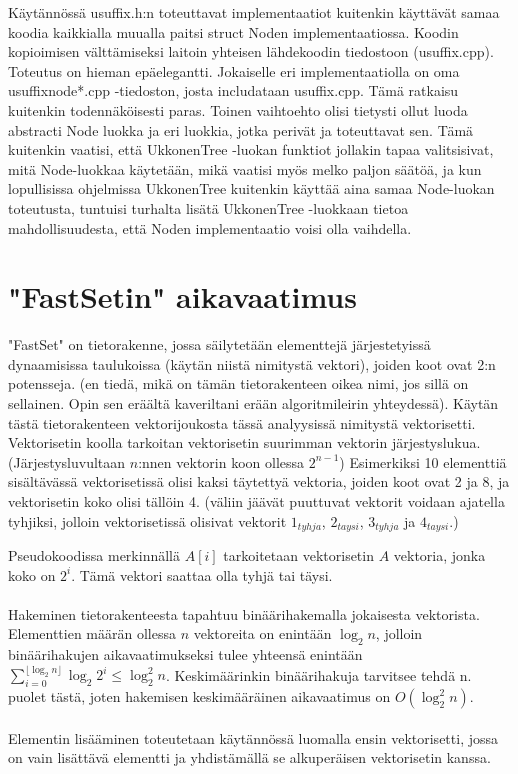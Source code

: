\documentclass{article}
\begin{document}
        Käytännössä usuffix.h:n toteuttavat implementaatiot kuitenkin käyttävät samaa koodia kaikkialla muualla paitsi
        struct Noden implementaatiossa. Koodin kopioimisen välttämiseksi laitoin yhteisen lähdekoodin tiedostoon (usuffix.cpp).
        Toteutus on hieman epäelegantti. Jokaiselle eri implementaatiolla on oma usuffixnode*.cpp -tiedoston, josta 
        includataan usuffix.cpp. Tämä ratkaisu kuitenkin todennäköisesti paras. Toinen vaihtoehto olisi tietysti ollut
        luoda abstracti Node luokka ja eri luokkia, jotka perivät ja toteuttavat sen. Tämä kuitenkin vaatisi, että
        UkkonenTree -luokan funktiot jollakin tapaa valitsisivat, mitä Node-luokkaa käytetään, mikä vaatisi myös melko
        paljon säätöä, ja kun lopullisissa ohjelmissa UkkonenTree kuitenkin käyttää aina samaa Node-luokan toteutusta,
        tuntuisi turhalta lisätä UkkonenTree -luokkaan tietoa mahdollisuudesta, että Noden implementaatio voisi olla 
        vaihdella.
        
  \newpage
  \section{"FastSetin" aikavaatimus}

    "FastSet" on tietorakenne, jossa säilytetään elementtejä järjestetyissä dynaamisissa taulukoissa (käytän niistä
    nimitystä vektori), joiden koot ovat 2:n potensseja. (en tiedä, mikä on tämän tietorakenteen oikea nimi, jos sillä 
    on sellainen. Opin sen eräältä kaveriltani erään algoritmileirin yhteydessä). Käytän tästä tietorakenteen vektorijoukosta
    tässä analyysissä nimitystä vektorisetti. Vektorisetin koolla tarkoitan vektorisetin suurimman vektorin järjestyslukua.
    (Järjestysluvultaan $n$:nnen vektorin koon ollessa $2^{n-1}$) Esimerkiksi 10 elementtiä sisältävässä vektorisetissä olisi 
    kaksi täytettyä vektoria, joiden koot ovat 2 ja 8, ja vektorisetin koko olisi tällöin 4. (väliin jäävät puuttuvat vektorit 
    voidaan ajatella tyhjiksi, jolloin vektorisetissä olisivat vektorit $1_{tyhja}$, $2_{taysi}$, $3_{tyhja}$ ja $4_{taysi}$.)
    
    Pseudokoodissa merkinnällä $A[i]$ tarkoitetaan vektorisetin $A$ vektoria, jonka koko on $2^i$. Tämä vektori saattaa
    olla tyhjä tai täysi.
    \\ \\
    Hakeminen tietorakenteesta tapahtuu binäärihakemalla jokaisesta vektorista. Elementtien määrän ollessa $n$ vektoreita on 
    enintään $\log_2n$, jolloin binäärihakujen aikavaatimukseksi tulee yhteensä enintään $\sum_{i=0}^{\lfloor \log_2n \rfloor}
    {\log_2{2^i}}\leq \log_2^2 n$. Keskimäärinkin binäärihakuja tarvitsee tehdä n. puolet tästä, joten hakemisen keskimääräinen
    aikavaatimus on $O(\log_2^2 n)$.
    \\ \\
    Elementin lisääminen toteutetaan käytännössä luomalla ensin vektorisetti, jossa on vain lisättävä elementti ja yhdistämällä 
    se alkuperäisen vektorisetin kanssa.
    
\end{document}
